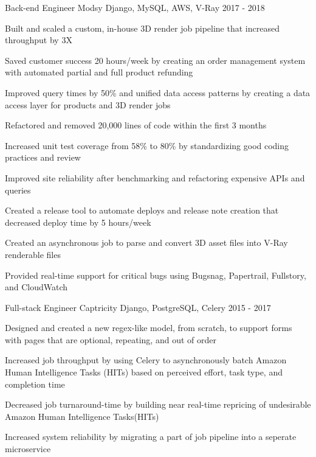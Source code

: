 \begin{cventries}
  \cventry
    {Back-end Engineer}
    {Modsy}
    {Django, MySQL, AWS, V-Ray}
    {2017 - 2018}
    {
      \begin{cvitems}
        \item {Built and scaled a custom, in-house 3D render job pipeline that increased throughput by 3X}
        \item {Saved customer success 20 hours/week by creating an order management system with automated partial and full product refunding}
        \item {Improved query times by 50\% and unified data access patterns by creating a data access layer for products and 3D render jobs}
        \item {Refactored and removed 20,000 lines of code within the first 3 months}
        \item {Increased unit test coverage from 58\% to 80\% by standardizing good coding practices and review}
        \item {Improved site reliability after benchmarking and refactoring expensive APIs and queries}
        \item {Created a release tool to automate deploys and release note creation that decreased deploy time by 5 hours/week}
        \item {Created an asynchronous job to parse and convert 3D asset files into V-Ray renderable files}
        \item {Provided real-time support for critical bugs using Bugsnag, Papertrail, Fullstory, and CloudWatch}
      \end{cvitems}
    }
  \cventry
    {Full-stack Engineer}
    {Captricity}
    {Django, PostgreSQL, Celery}
    {2015 - 2017}
    {
      \begin{cvitems}
        \item {Designed and created a new regex-like model, from scratch, to support forms with pages that are optional, repeating, and out of order}
        \item {Increased job throughput by using Celery to asynchronously batch Amazon Human Intelligence Tasks (HITs) based on perceived effort, task type, and completion time}
        \item {Decreased job turnaround-time by building near real-time repricing of undesirable Amazon Human Intelligence Tasks(HITs)}
        \item {Increased system reliability by migrating a part of job pipeline into a seperate microservice}

\end{cvitems}}
\end{cventries}
